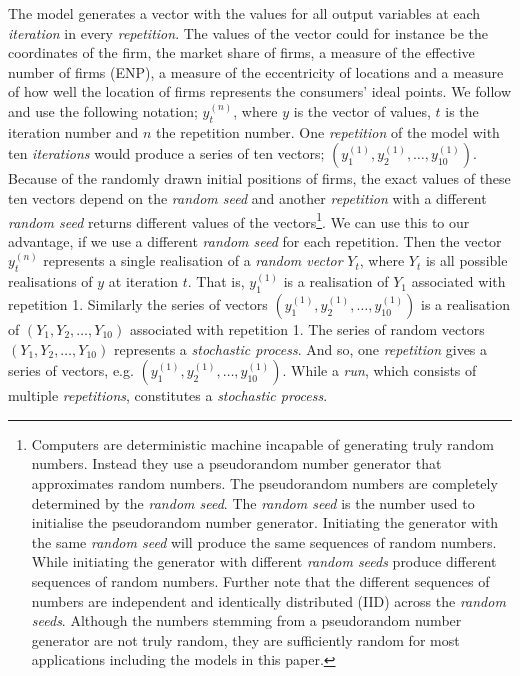 \documentclass[preprint, 12pt]{elsarticle}
\begin{document}
The model generates a vector with the values for all output variables at each \emph{iteration} in every \emph{repetition}. The values of the vector could for instance be the coordinates of the firm, the market share of firms, a measure of the effective number of firms (ENP), a measure of the eccentricity of locations and a measure of how well the location of firms represents the consumers' ideal points. We follow \citet{Laver_Sergenti_2011} and use the following notation; $y_t^{(n)}$, where $y$ is the vector of values, $t$ is the iteration number and $n$ the repetition number. One \emph{repetition} of the model with ten \emph{iterations} would produce a series of ten vectors; $( y_1^{(1)}, y_2^{(1)}, \dots, y_{10}^{(1)} )$. Because of the randomly drawn initial positions of firms, the exact values of these ten vectors depend on the \emph{random seed} and another \emph{repetition} with a different \emph{random seed} returns different values of the vectors\footnote{Computers are deterministic machine incapable of generating truly random numbers. Instead they use a pseudorandom number generator that approximates random numbers. The pseudorandom numbers are completely determined by the \emph{random seed}. The \emph{random seed} is the number used to initialise the pseudorandom number generator. Initiating the generator with the same \emph{random seed} will produce the same sequences of random numbers. While initiating the generator with different \emph{random seeds} produce different sequences of random numbers. Further note that the different sequences of numbers are independent and identically distributed (IID) across the \emph{random seeds}. Although the numbers stemming from a pseudorandom number generator are not truly random, they are sufficiently random for most applications including the models in this paper.}. We can use this to our advantage, if we use a different \emph{random seed} for each repetition. Then the vector $y_t^{(n)}$ represents a single realisation of a \emph{random vector} $Y_t$, where $Y_t$ is all possible realisations of $y$ at iteration $t$. That is, $y_1^{(1)}$ is a realisation of $Y_1$ associated with repetition 1. Similarly the series of vectors $( y_1^{(1)}, y_2^{(1)}, \dots, y_{10}^{(1)} )$ is a realisation of $( Y_1, Y_2, \dots, Y_{10} )$ associated with repetition 1. The series of random vectors $( Y_1, Y_2, \dots, Y_{10} )$ represents a \emph{stochastic process}. And so, one \emph{repetition} gives a series of vectors, e.g. $( y_1^{(1)}, y_2^{(1)}, \dots, y_{10}^{(1)} )$. While a \emph{run}, which consists of multiple \emph{repetitions}, constitutes a \emph{stochastic process}.
\end{document}
